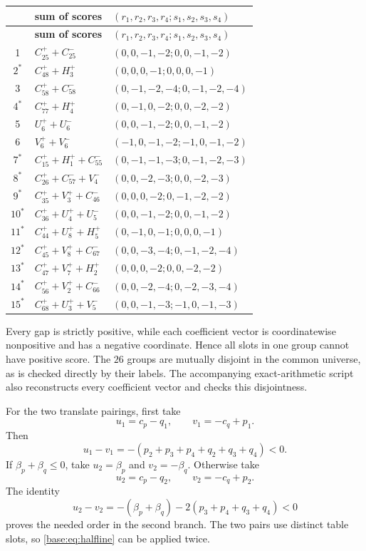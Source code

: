 \documentclass[11pt,a4paper]{article}
\theoremstyle{remark}
\begin{document}
\begingroup
\scriptsize
\setlength{\tabcolsep}{3.6pt}
\begin{longtable}{c>{\raggedright\arraybackslash}p{}p{}}
\toprule
&\textbf{sum of scores}&$(r_1,r_2,r_3,r_4;s_1,s_2,s_3,s_4)$\\
\midrule
\endfirsthead
\toprule
&\textbf{sum of scores}&$(r_1,r_2,r_3,r_4;s_1,s_2,s_3,s_4)$\\
\midrule
\endhead
1&$C^+_{25}+C^-_{25}$&$(0,0,-1,-2;0,0,-1,-2)$\\
$2^*$&$C^+_{48}+H^+_3$&$(0,0,0,-1;0,0,0,-1)$\\
3&$C^+_{58}+C^-_{58}$&$(0,-1,-2,-4;0,-1,-2,-4)$\\
$4^*$&$C^+_{77}+H^+_4$&$(0,-1,0,-2;0,0,-2,-2)$\\
5&$U^+_6+U^-_6$&$(0,0,-1,-2;0,0,-1,-2)$\\
6&$V^+_6+V^-_6$&$(-1,0,-1,-2;-1,0,-1,-2)$\\
$7^*$&$C^+_{15}+H^+_1+C^-_{55}$&$(0,-1,-1,-3;0,-1,-2,-3)$\\
$8^*$&$C^+_{26}+C^-_{57}+V^-_4$&$(0,0,-2,-3;0,0,-2,-3)$\\
$9^*$&$C^+_{35}+V^+_3+C^-_{46}$&$(0,0,0,-2;0,-1,-2,-2)$\\
$10^*$&$C^+_{36}+U^+_4+U^-_5$&$(0,0,-1,-2;0,0,-1,-2)$\\
$11^*$&$C^+_{44}+U^+_8+H^+_5$&$(0,-1,0,-1;0,0,0,-1)$\\
$12^*$&$C^+_{45}+V^+_8+C^-_{67}$&$(0,0,-3,-4;0,-1,-2,-4)$\\
$13^*$&$C^+_{47}+V^+_7+H^+_2$&$(0,0,0,-2;0,0,-2,-2)$\\
$14^*$&$C^+_{56}+V^+_2+C^-_{66}$&$(0,0,-2,-4;0,-2,-3,-4)$\\
$15^*$&$C^+_{68}+U^+_3+V^-_5$&$(0,0,-1,-3;-1,0,-1,-3)$\\
\bottomrule
\end{longtable}
\endgroup

Every gap is strictly positive, while each coefficient vector is
coordinatewise nonpositive and has a negative coordinate.  Hence all slots in
one group cannot have positive score.  The $26$ groups are mutually disjoint in the common universe, as is checked
directly by their labels. The accompanying exact-arithmetic script also
reconstructs every coefficient vector and checks this disjointness.

For the two translate pairings, first take
\[
 u_1=c_p-q_1,\qquad v_1=-c_q+p_1.
\]
Then
\[
 u_1-v_1=-(p_2+p_3+p_4+q_2+q_3+q_4)<0.
\]
If $\beta_p+\beta_q\leq0$, take
$u_2=\beta_p$ and $v_2=-\beta_q$.  Otherwise take
\[
 u_2=c_p-q_2,\qquad v_2=-c_q+p_2.
\]
The identity
\[
 u_2-v_2=-(\beta_p+\beta_q)-2(p_3+p_4+q_3+q_4)<0
\]
proves the needed order in the second branch.  The two pairs use distinct
table slots, so \eqref{base:eq:halfline} can be applied twice.
\end{document}
